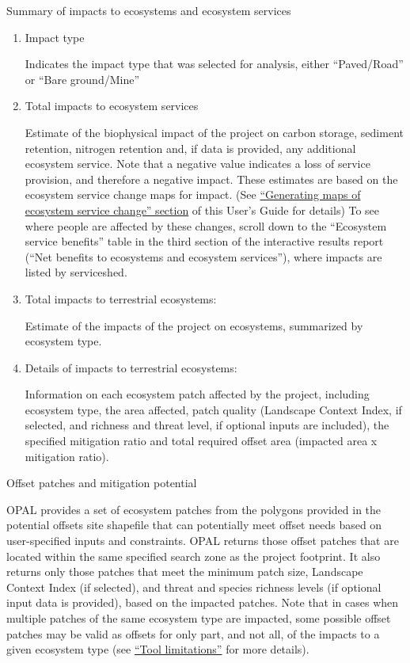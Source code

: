 \documentclass[11pt,letterpaper]{report}
\newenvironment{myenumerate}{%
	\edef\backupindent{\the\parindent}
	\enumerate
	\setlength{\parindent}{\backupindent}
		\setlist[enumerate,1]{label=(\arabic*)}
		\setlist[enumerate,2]{label=(\arabic*)}
}{\endenumerate}
\begin{document}
	\begin{myenumerate}		
	
		{\bfseries \item Summary of impacts to ecosystems and ecosystem services}
		
		\begin{enumerate}[label=\alph*.]
			\item Impact type
				
				Indicates the impact type that was selected for analysis, either ``Paved/Road'' or ``Bare ground/Mine''
				
			\item Total impacts to ecosystem services
			
				Estimate of the biophysical impact of the project on carbon storage, sediment retention, nitrogen retention and, if data is provided, any additional ecosystem service. Note that a negative value indicates a loss of service provision, and therefore a negative impact. These estimates are based on the ecosystem service change maps for impact. (See \hyperref[ch:maps]{``Generating maps of ecosystem service change'' section} of this User's Guide for details) To see where people are affected by these changes, scroll down to the ``Ecosystem service benefits'' table in the third section of the interactive results report (``Net benefits to ecosystems and ecosystem services''), where impacts are listed by serviceshed.
				
			\item Total impacts to terrestrial ecosystems: 
				
				Estimate of the impacts of the project on ecosystems, summarized by ecosystem type.
				
			\item Details of impacts to terrestrial ecosystems: 
			
				Information on each ecosystem patch affected by the project, including ecosystem type, the area affected, patch quality (Landscape Context Index, if selected, and richness and threat level, if optional inputs are included), the specified mitigation ratio and total required offset area (impacted area x mitigation ratio).
				
		\end{enumerate}
		
		
		{\bfseries \item  Offset patches and mitigation potential}
			
			OPAL provides a set of ecosystem patches from the polygons provided in the potential offsets site shapefile that can potentially meet offset needs based on user-specified inputs and constraints. OPAL returns those offset patches that are located within the same specified search zone as the project footprint. It also returns only those patches that meet the minimum patch size, Landscape Context Index (if selected), and threat and species richness levels (if optional input data is provided), based on the impacted patches. Note that in cases when multiple patches of the same ecosystem type are impacted, some possible offset patches may be valid as offsets for only part, and not all, of the impacts to a given ecosystem type (see \hyperref[ch:limits]{``Tool limitations''} for more details).
			

\end{myenumerate}
\end{document}
